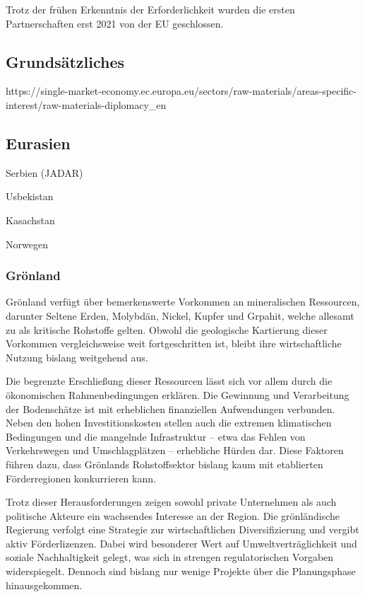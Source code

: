 \documentclass[12pt,a4paper,oneside]{book} %
\begin{document}
Trotz der frühen Erkenntnis der Erforderlichkeit wurden die ersten Partnerschaften erst 2021 von der EU geschlossen.

\subsection{Grundsätzliches}

https://single-market-economy.ec.europa.eu/sectors/raw-materials/areas-specific-interest/raw-materials-diplomacy_en

\subsection{Eurasien}

Serbien (JADAR)

Usbekistan

Kasachstan

Norwegen

\subsubsection{Grönland}

Grönland verfügt über bemerkenswerte Vorkommen an mineralischen Ressourcen, darunter Seltene Erden, Molybdän, Nickel, Kupfer und Grpahit, welche allesamt zu als kritische Rohstoffe gelten. Obwohl die geologische Kartierung dieser Vorkommen vergleichsweise weit fortgeschritten ist, bleibt ihre wirtschaftliche Nutzung bislang weitgehend aus.

Die begrenzte Erschließung dieser Ressourcen lässt sich vor allem durch die ökonomischen Rahmenbedingungen erklären. Die Gewinnung und Verarbeitung der Bodenschätze ist mit erheblichen finanziellen Aufwendungen verbunden. Neben den hohen Investitionskosten stellen auch die extremen klimatischen Bedingungen und die mangelnde Infrastruktur – etwa das Fehlen von Verkehrswegen und Umschlagplätzen – erhebliche Hürden dar. Diese Faktoren führen dazu, dass Grönlands Rohstoffsektor bislang kaum mit etablierten Förderregionen konkurrieren kann.

Trotz dieser Herausforderungen zeigen sowohl private Unternehmen als auch politische Akteure ein wachsendes Interesse an der Region. Die grönländische Regierung verfolgt eine Strategie zur wirtschaftlichen Diversifizierung und vergibt aktiv Förderlizenzen. Dabei wird besonderer Wert auf Umweltverträglichkeit und soziale Nachhaltigkeit gelegt, was sich in strengen regulatorischen Vorgaben widerspiegelt. Dennoch sind bislang nur wenige Projekte über die Planungsphase hinausgekommen.
\end{document}
